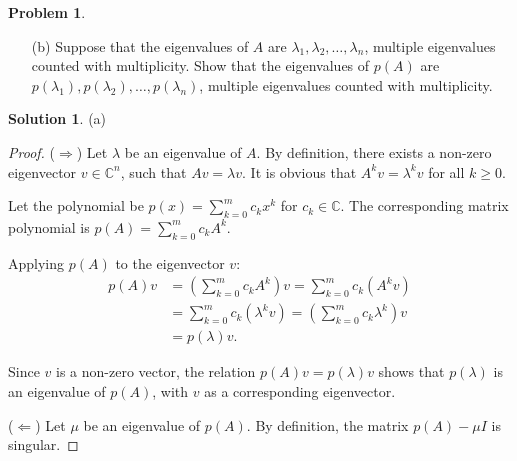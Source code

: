\documentclass[12pt]{article}
\theoremstyle{definition}
\newtheorem*{solution}{\normalfont\textbf{Solution}}
\newtheorem*{Problem}{\noindent\textbf{Problem}}
\begin{document}
\begin{enumerate}[leftmargin=*]
\begin{Problem}
\begin{enumerate}
                Optional Requirements:
                \begin{itemize}
                    \item Give a proof without using determinants or matrix decomposition.
                    \item Give a proof from a geometric point of view.
                    \item Give a proof from an algebraic point of view.
                \end{itemize}
                \item[(b)] Suppose that the eigenvalues of \( A \) are \( \lambda_1, \lambda_2, \ldots, \lambda_n \), multiple eigenvalues counted with multiplicity. Show that the eigenvalues of \( p(A) \) are \( p(\lambda_1), p(\lambda_2), \ldots, p(\lambda_n) \), multiple eigenvalues counted with multiplicity.
            \end{enumerate}
        \end{Problem}
        \begin{solution}
            \item[(a)]
            \begin{proof}
                \noindent ($\Rightarrow$) 
                Let $\lambda$ be an eigenvalue of $A$. By definition, there exists a non-zero eigenvector $v \in \mathbb{C}^n$, such that
                \(Av = \lambda v \). It is obvious that $A^k v = \lambda^k v$ for all $k \geq 0$.
            

                Let the polynomial be $p(x) = \sum_{k=0}^m c_k x^k$ for $c_k \in \mathbb{C}$. The corresponding matrix polynomial is $p(A) = \sum_{k=0}^m c_k A^k$.

                Applying $p(A)$ to the eigenvector $v$:
                \begin{align*}
                p(A)v &= \left( \sum_{k=0}^m c_k A^k \right) v = \sum_{k=0}^m c_k (A^k v) \\
                &= \sum_{k=0}^m c_k (\lambda^k v) = \left( \sum_{k=0}^m c_k \lambda^k \right) v \\
                &= p(\lambda)v.
                \end{align*}

                Since $v$ is a non-zero vector, the relation $p(A)v = p(\lambda)v$ shows that $p(\lambda)$ is an eigenvalue of $p(A)$, with $v$ as a corresponding eigenvector.
                
                \noindent($\Leftarrow$)
                Let $\mu$ be an eigenvalue of $p(A)$. By definition, the matrix $p(A) - \mu I$ is singular.


\end{proof}
\end{solution}
\end{enumerate}
\end{document}
